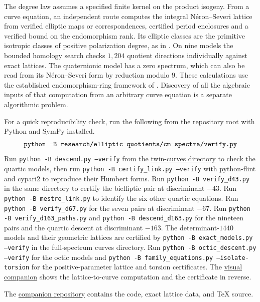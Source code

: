 \documentclass[11pt,letterpaper]{amsart}
\theoremstyle{definition}
\numberwithin{equation}{section}
\begin{document}
The degree law assumes a specified finite kernel on the product
isogeny. From a curve equation, an independent route computes the
integral N\'eron--Severi lattice from verified elliptic maps or
correspondences, certified period enclosures and a verified bound
on the endomorphism rank. Its elliptic classes are the primitive
isotropic classes of positive polarization degree, as in
\cite{KaniI,KaniII}. On nine models the bounded homology search
checks \(1{,}204\) quotient directions individually against exact
lattices. The quaternionic model has a zero spectrum, which can
also be read from its N\'eron--Severi form by reduction modulo \(9\).
These calculations use the established endomorphism-ring framework
of \cite{CMSV,Lombardo}. Discovery of all the algebraic inputs of
that computation from an arbitrary curve equation is a separate
algorithmic problem.

For a quick reproducibility check, run the following from the
repository root with Python and SymPy installed.
\[
\begin{gathered}
\text{\ttfamily python -B research/elliptic-quotients/cm-spectra/verify.py}
\end{gathered}
\]
Run \texttt{python -B descend.py --verify} from the
\href{https://github.com/towre676-cloud/crest-root-calculus/tree/main/research/elliptic-quotients/twin-curves}{twin-curves directory}
to check the quartic models, then run
\texttt{python -B certify\_link.py --verify} with python-flint and
cypari2 to reproduce their Humbert forms. Run
\texttt{python -B verify\_d43.py} in the same directory to certify the
bielliptic pair at discriminant \(-43\). Run
\texttt{python -B mestre\_link.py} to identify the six other quartic
equations. Run \texttt{python -B verify\_d67.py} for the seven pairs at discriminant \(-67\). Run \texttt{python -B verify\_d163\_paths.py} and
\texttt{python -B descend\_d163.py} for the nineteen pairs and the
quartic descent at discriminant \(-163\). The determinant-\(1440\)
models and their geometric lattices are certified by
\texttt{python -B exact\_models.py --verify} in the full-spectrum
curves directory. Run \texttt{python -B octic\_descent.py --verify}
for the octic models and \texttt{python -B family\_equations.py --isolate-torsion}
for the positive-parameter lattice and torsion certificates. The
\href{https://github.com/towre676-cloud/crest-root-calculus/tree/main/docs/visuals}{visual companion}
shows the lattice-to-curve computation and the certificate in reverse.

The \href{https://github.com/towre676-cloud/crest-root-calculus}{companion repository}
contains the code, exact lattice data, and \TeX{} source.
\end{document}
